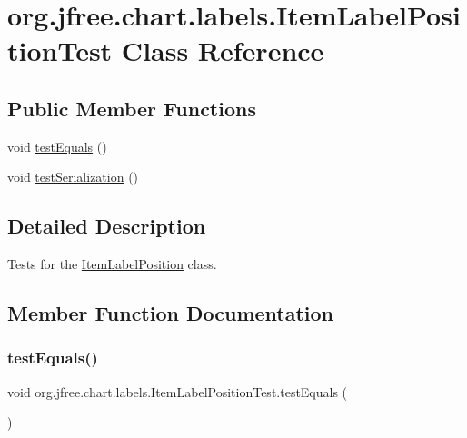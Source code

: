 \hypertarget{classorg_1_1jfree_1_1chart_1_1labels_1_1_item_label_position_test}{}\section{org.\+jfree.\+chart.\+labels.\+Item\+Label\+Position\+Test Class Reference}
\label{classorg_1_1jfree_1_1chart_1_1labels_1_1_item_label_position_test}
\subsection*{Public Member Functions}
\begin{DoxyCompactItemize}
\item 
void \mbox{\hyperlink{classorg_1_1jfree_1_1chart_1_1labels_1_1_item_label_position_test_a1edeb9554076a8bc55a1698ca4738320}{test\+Equals}} ()
\item 
void \mbox{\hyperlink{classorg_1_1jfree_1_1chart_1_1labels_1_1_item_label_position_test_a3c0308122763cd60c03585d6aff6970f}{test\+Serialization}} ()
\end{DoxyCompactItemize}


\subsection{Detailed Description}
Tests for the \mbox{\hyperlink{classorg_1_1jfree_1_1chart_1_1labels_1_1_item_label_position}{Item\+Label\+Position}} class. 

\subsection{Member Function Documentation}
\mbox{\label{classorg_1_1jfree_1_1chart_1_1labels_1_1_item_label_position_test_a1edeb9554076a8bc55a1698ca4738320}} 
\subsubsection{\texorpdfstring{test\+Equals()}{testEquals()}}
{\footnotesize\ttfamily void org.\+jfree.\+chart.\+labels.\+Item\+Label\+Position\+Test.\+test\+Equals (\begin{DoxyParamCaption}{ }\end{DoxyParamCaption})}

